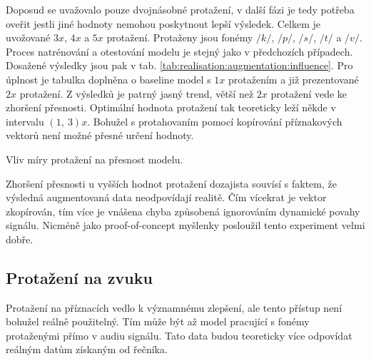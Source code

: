 Doposud se uvažovalo pouze dvojnásobné protažení, v další fázi je tedy potřeba oveřit jestli jiné hodnoty nemohou poskytnout lepší výsledek. Celkem je uvožované $3x$, $4x$ a $5x$ protažení. Protaženy jsou fonémy $/k/$, $/p/$, $/s/$, $/t/$ a $/v/$. Proces natrénování a otestování modelu je stejný jako v předchozích případech. Dosažené výsledky jsou pak v tab. \ref{tab:realisation:augmentation:influence}. Pro úplnost je tabulka doplněna o baseline model s $1x$ protažením a již prezentované $2x$ protažení. Z výsledků je patrný jasný trend, větší než $2x$ protažení vede ke zhoršení přesnosti. Optimální hodnota protažení tak teoreticky leží někde v intervalu $\left(1,\ 3\right)x$. Bohužel s protahovaním pomocí kopírování příznakových vektorů není možné přesné určení hodnoty.

\begin{table}[htpb]
  \centering
  \def\arraystretch{1.5}
  \caption{Vliv míry protažení na přesnost modelu.}
  \label{tab:realisation:augmentation:influence}
\end{table}

Zhoršení přesnosti u vyšších hodnot protažení dozajista souvísí s faktem, že výsledná augmentovaná data neodpovídají realitě. Čím vícekrat je vektor zkopírován, tím více je vnášena chyba způsobená ignorováním dynamické povahy signálu. Nicméně jako proof-of-concept myšlenky posloužil tento experiment velmi dobře.

\subsection{Protažení na zvuku}
\label{chap:realisation:augmentation:audio}

Protažení na příznacích vedlo k významnému zlepšení, ale tento přístup není bohužel reálně použitelný. Tím může být až model pracující s fonémy protaženými přímo v audiu signálu. Tato data budou teoreticky více odpovídat reálným datům získaným od řečníka.

